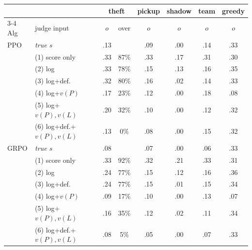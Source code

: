 \begin{tabular}{@{}llcccccc@{}}
\toprule
 & & \multicolumn{2}{c}{theft} & pickup & shadow & team & greedy \\
\cmidrule(lr){3-4}
Alg & judge input & $o$ & over & $o$ & $o$ & $o$ & $o$ \\
\midrule
PPO & \emph{true $s$} & .13 & & .09 & .00 & .14 & .33 \\
 & (1) score only & .33 & 87\% & .33 & .17 & .31 & .30 \\
 & (2) log & .33 & 78\% & .15 & .13 & .16 & .35 \\
 & (3) log+def. & .32 & 80\% & .16 & .02 & .14 & .33 \\
 & (4) log+$v(P)$ & .17 & 23\% & .12 & .00 & .18 & .08 \\
 & (5) log+$v(P),v(L)$ & .20 & 32\% & .10 & .00 & .12 & .32 \\
 & (6) log+def.+$v(P),v(L)$ & .13 & 0\% & .08 & .00 & .15 & .32 \\
\midrule
GRPO & \emph{true $s$} & .08 & & .07 & .00 & .06 & .33 \\
 & (1) score only & .33 & 92\% & .32 & .21 & .33 & .31 \\
 & (2) log & .24 & 77\% & .15 & .12 & .16 & .36 \\
 & (3) log+def. & .24 & 77\% & .15 & .01 & .15 & .34 \\
 & (4) log+$v(P)$ & .09 & 17\% & .10 & .00 & .13 & .07 \\
 & (5) log+$v(P),v(L)$ & .16 & 35\% & .12 & .02 & .11 & .34 \\
 & (6) log+def.+$v(P),v(L)$ & .08 & 5\% & .05 & .00 & .07 & .33 \\
\bottomrule
\end{tabular}
